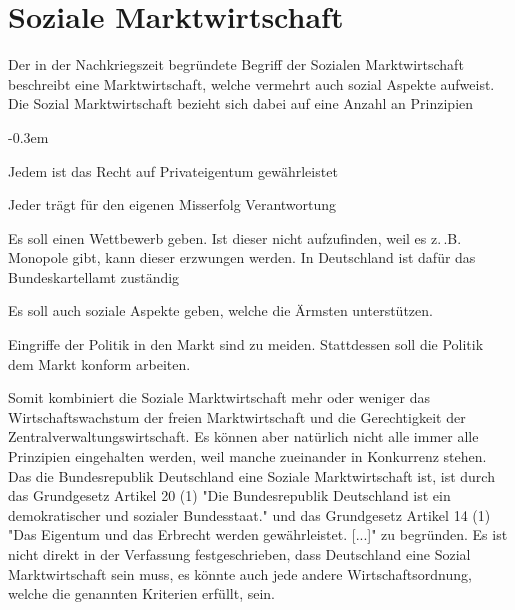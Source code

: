 \documentclass{article}
\begin{document}
 
 
\section{Soziale Marktwirtschaft}
\begin{multicols}{1}
\noindent Der in der Nachkriegszeit begründete Begriff der Sozialen Marktwirtschaft beschreibt eine Marktwirtschaft, welche vermehrt auch sozial Aspekte aufweist. \newline
Die Sozial Marktwirtschaft bezieht sich dabei auf eine Anzahl an Prinzipien
\begin{description}
 \itemsep-0.3em 
 \item[Eigentumsprinzip] Jedem ist das Recht auf Privateigentum gewährleistet 
 \item[Haftungsprinzip] Jeder trägt für den eigenen Misserfolg Verantwortung
 \item[Wettbewerbsprinzip] Es soll einen Wettbewerb geben. Ist dieser nicht aufzufinden, weil es z.\,.B. Monopole gibt, kann dieser erzwungen werden. In Deutschland ist dafür das Bundeskartellamt zuständig
 \item[Sozialprinzip] Es soll auch soziale Aspekte geben, welche die Ärmsten unterstützen.
 \item[Marktkonformitätsprinzip] Eingriffe der Politik in den Markt sind zu meiden. Stattdessen soll die Politik dem Markt konform arbeiten.
\end{description}
\columnbreak 
Somit kombiniert die Soziale Marktwirtschaft mehr oder weniger das Wirtschaftswachstum der freien Marktwirtschaft und die Gerechtigkeit der Zentralverwaltungswirtschaft. Es können aber natürlich nicht alle immer alle Prinzipien eingehalten werden, weil manche zueinander in Konkurrenz stehen. \newline 
Das die Bundesrepublik Deutschland eine Soziale Marktwirtschaft ist, ist durch das Grundgesetz Artikel 20 (1) "Die Bundesrepublik Deutschland ist ein demokratischer und sozialer Bundesstaat." und das Grundgesetz Artikel 14 (1) "Das Eigentum und das Erbrecht werden gewährleistet. [...]" zu begründen. Es ist nicht direkt in der Verfassung festgeschrieben, dass Deutschland eine Sozial Marktwirtschaft sein muss, es könnte auch jede andere Wirtschaftsordnung, welche die genannten Kriterien erfüllt, sein.
\end{multicols}
 
\end{document}
